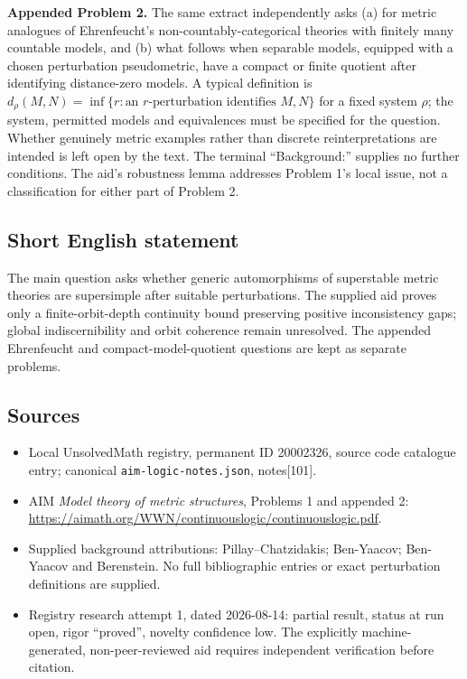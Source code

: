 \documentclass[11pt]{article}
\begin{document}
\textbf{Appended Problem 2.} The same extract independently asks (a) for metric analogues of Ehrenfeucht's non-countably-categorical theories with finitely many countable models, and (b) what follows when separable models, equipped with a chosen perturbation pseudometric, have a compact or finite quotient after identifying distance-zero models. A typical definition is $d_\rho(M,N)=\inf\{r:\text{an }r\text{-perturbation identifies }M,N\}$ for a fixed system $\rho$; the system, permitted models and equivalences must be specified for the question. Whether genuinely metric examples rather than discrete reinterpretations are intended is left open by the text. The terminal ``Background:'' supplies no further conditions. The aid's robustness lemma addresses Problem 1's local issue, not a classification for either part of Problem 2.
\subsection{Short English statement}
The main question asks whether generic automorphisms of superstable metric theories are supersimple after suitable perturbations. The supplied aid proves only a finite-orbit-depth continuity bound preserving positive inconsistency gaps; global indiscernibility and orbit coherence remain unresolved. The appended Ehrenfeucht and compact-model-quotient questions are kept as separate problems.
\subsection{Sources}
\begin{itemize}
\item Local UnsolvedMath registry, permanent ID 20002326, source code catalogue entry; canonical \texttt{aim-logic-notes.json}, notes[101].
\item AIM \emph{Model theory of metric structures}, Problems 1 and appended 2: \url{https://aimath.org/WWN/continuouslogic/continuouslogic.pdf}.
\item Supplied background attributions: Pillay--Chatzidakis; Ben-Yaacov; Ben-Yaacov and Berenstein. No full bibliographic entries or exact perturbation definitions are supplied.
\item Registry research attempt 1, dated 2026-08-14: partial result, status at run open, rigor ``proved'', novelty confidence low. The explicitly machine-generated, non-peer-reviewed aid requires independent verification before citation.
\end{itemize}
\end{document}
